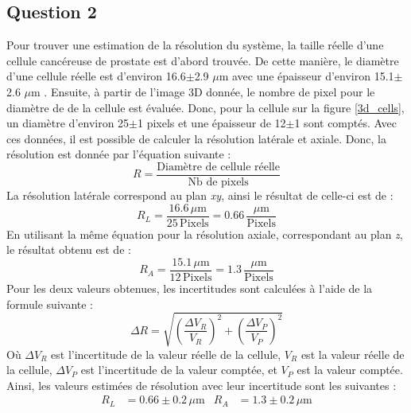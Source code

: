 \documentclass[11pt,letterpaper]{article}
\begin{document}
\subsection{Question 2}
Pour trouver une estimation de la résolution du système, la taille réelle d'une cellule cancéreuse de prostate est d'abord trouvée. De cette manière, le diamètre d'une cellule réelle est d'environ 16.6$\pm$2.9 $\mu$m avec une épaisseur d'environ 15.1$\pm$2.6 $\mu$m \cite{seo_mechanical_2017}. Ensuite, à partir de l'image 3D donnée, le nombre de pixel pour le diamètre de de la cellule est évaluée. Donc, pour la cellule sur la figure \ref{3d_cells}, un diamètre d'environ 25$\pm$1 pixels et une épaisseur de 12$\pm$1 sont comptés. Avec ces données, il est possible de calculer la résolution latérale et axiale. Donc, la résolution est donnée par l'équation suivante :
\begin{equation}
  R=\frac{\text{Diamètre de cellule réelle}}{\text{Nb de pixels}}
\end{equation}
La résolution latérale correspond au plan \textit{xy}, ainsi le résultat de celle-ci est de :
\begin{equation}
  R_{L}=\frac{16.6\,\mu\mathrm{m}}{25\,\mathrm{Pixels}}=0.66\,\frac{\mu\mathrm{m}}{\mathrm{Pixels}}
\end{equation}
En utilisant la même équation pour la résolution axiale, correspondant au plan \textit{z}, le résultat obtenu est de :
\begin{equation}
  R_{A}=\frac{15.1\,\mu\mathrm{m}}{12\,\mathrm{Pixels}}=1.3\,\frac{\mu\mathrm{m}}{\mathrm{Pixels}}
\end{equation}
Pour les deux valeurs obtenues, les incertitudes sont calculées à l'aide de la formule suivante :
\begin{equation}
  \Delta R=\sqrt{\left(\frac{\Delta V_{R}}{V_{R}}\right)^{2}+\left(\frac{\Delta V_{P}}{V_{P}}\right)^{2}}
\end{equation}
Où $\Delta V_{R}$ est l'incertitude de la valeur réelle de la cellule, $V_{R}$ est la valeur réelle de la cellule, $\Delta V_{P}$ est l'incertitude de la valeur comptée, et $V_{P}$ est la valeur comptée. Ainsi, les valeurs estimées de résolution avec leur incertitude sont les suivantes :
\begin{align*}
  R_{L}&=0.66\pm0.2\,\mu\mathrm{m} & R_{A}&=1.3\pm0.2\,\mu\mathrm{m} \\
\end{align*}
\end{document}

